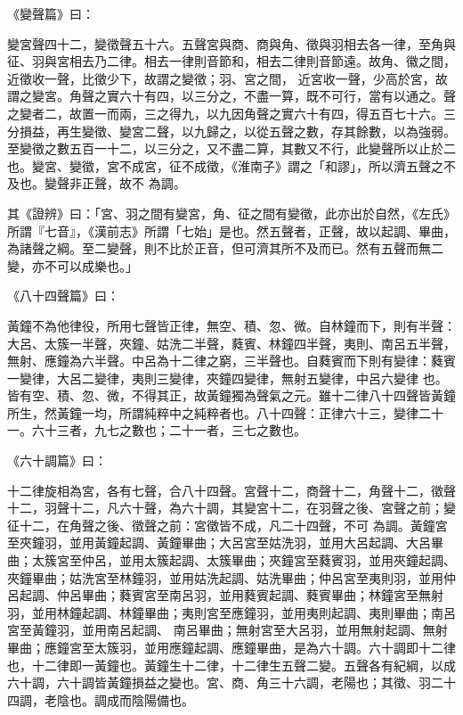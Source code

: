 \begin{pinyinscope}
 《變聲篇》曰：



 變宮聲四十二，變徵聲五十六。五聲宮與商、商與角、徵與羽相去各一律，至角與征、羽與宮相去乃二律。相去一律則音節和，相去二律則音節遠。故角、徽之間，近徵收一聲，比徵少下，故謂之變徵；羽、宮之間，
 近宮收一聲，少高於宮，故謂之變宮。角聲之實六十有四，以三分之，不盡一算，既不可行，當有以通之。聲之變者二，故置一而兩，三之得九，以九因角聲之實六十有四，得五百七十六。三分損益，再生變徵、變宮二聲，以九歸之，以從五聲之數，存其餘數，以為強弱。至變徵之數五百一十二，以三分之，又不盡二算，其數又不行，此變聲所以止於二也。變宮、變徵，宮不成宮，征不成徵，《淮南子》謂之「和謬」，所以濟五聲之不及也。變聲非正聲，故不
 為調。



 其《證辨》曰：「宮、羽之間有變宮，角、征之間有變徵，此亦出於自然，《左氏》所謂『七音』，《漢前志》所謂「七始」是也。然五聲者，正聲，故以起調、畢曲，為諸聲之綱。至二變聲，則不比於正音，但可濟其所不及而已。然有五聲而無二變，亦不可以成樂也。」



 《八十四聲篇》曰：



 黃鐘不為他律役，所用七聲皆正律，無空、積、忽、微。自林鐘而下，則有半聲：大呂、太簇一半聲，夾鐘、姑洗二半聲，蕤賓、林鐘四半聲，夷則、南呂五半聲，無射、應鐘為六半聲。中呂為十二律之窮，三半聲也。自蕤賓而下則有變律：蕤賓一變律，大呂二變律，夷則三變律，夾鐘四變律，無射五變律，中呂六變律
 也。皆有空、積、忽、微，不得其正，故黃鐘獨為聲氣之元。雖十二律八十四聲皆黃鐘所生，然黃鐘一均，所謂純粹中之純粹者也。八十四聲：正律六十三，變律二十一。六十三者，九七之數也；二十一者，三七之數也。



 《六十調篇》曰：



 十二律旋相為宮，各有七聲，合八十四聲。宮聲十二，商聲十二，角聲十二，徵聲十二，羽聲十二，凡六十聲，為六十調，其變宮十二，在羽聲之後、宮聲之前；變征十二，在角聲之後、徵聲之前：宮徵皆不成，凡二十四聲，不可
 為調。黃鐘宮至夾鐘羽，並用黃鐘起調、黃鐘畢曲；大呂宮至姑洗羽，並用大呂起調、大呂畢曲；太簇宮至仲呂，並用太簇起調、太簇畢曲；夾鐘宮至蕤賓羽，並用夾鐘起調、夾鐘畢曲；姑洗宮至林鐘羽，並用姑洗起調、姑洗畢曲；仲呂宮至夷則羽，並用仲呂起調、仲呂畢曲；蕤賓宮至南呂羽，並用蕤賓起調、蕤賓畢曲；林鐘宮至無射羽，並用林鐘起調、林鐘畢曲；夷則宮至應鐘羽，並用夷則起調、夷則畢曲；南呂宮至黃鐘羽，並用南呂起調、
 南呂畢曲；無射宮至大呂羽，並用無射起調、無射畢曲；應鐘宮至太簇羽，並用應鐘起調、應鐘畢曲，是為六十調。六十調即十二律也，十二律即一黃鐘也。黃鐘生十二律，十二律生五聲二變。五聲各有紀綱，以成六十調，六十調皆黃鐘損益之變也。宮、商、角三十六調，老陽也；其徵、羽二十四調，老陰也。調成而陰陽備也。




\end{pinyinscope}
